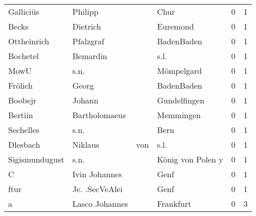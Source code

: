 \begin{center}
\begin{tiny}
\begin{longtabu}{llllrr}
                Galliciüs &                            Philipp &             &                                        Chur &          0 &         1 \\
                    Becks &                           Dietrich &             &                                    Euremond &          0 &         1 \\
              Ottheinrich &                          Pfalzgraf &             &                                  BadenBaden &          0 &         1 \\
                 Bochetel &                           Bemardin &             &                                        s.l. &          0 &         1 \\
                     MowU &                               s.n. &             &                                  Mömpelgard &          0 &         1 \\
                  Frölich &                              Georg &             &                                  BadenBaden &          0 &         1 \\
                  Boobejr &                             Johann &             &                                Gundelfingen &          0 &         1 \\
                  Bertiin &                      Bartholomaeus &             &                                   Memmingen &          0 &         1 \\
                Sechelles &                               s.n. &             &                                        Bern &          0 &         1 \\
                 Dlesbach &                            Niklaus &         von &                                        s.l. &          0 &         1 \\
           Sigismundugust &                               s.n. &             &                           König von Polen y &          0 &         1 \\
                        C &                      Ivin Johannes &             &                                        Genf &          0 &         1 \\
                     ftur &                     Je. .SecVeAlei &             &                                        Genf &          0 &         1 \\
                        a &                     Lasco Johannes &             &                                   Frankfurt &          0 &         3 \\

\end{longtabu}
\end{tiny}
\end{center}
